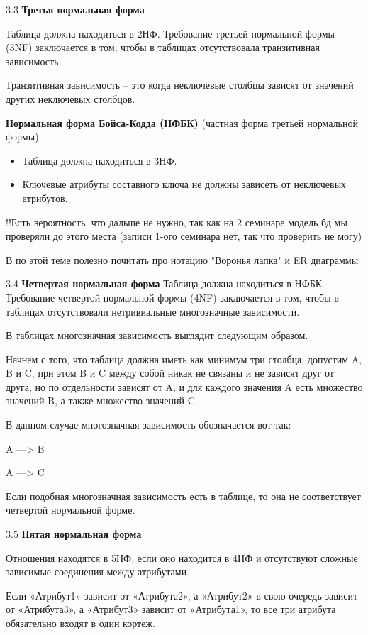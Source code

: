 3.3 \textbf{Третья нормальная форма}

Таблица должна находиться в 2НФ. Требование третьей нормальной формы (3NF) заключается в том, чтобы в таблицах отсутствовала транзитивная зависимость.

Транзитивная зависимость – это когда неключевые столбцы зависят от значений других неключевых столбцов.

\textbf{Нормальная форма Бойса-Кодда (НФБК)} (частная форма третьей нормальной формы)

\begin{itemize}
	\item Таблица должна находиться в 3НФ. 
	\item Ключевые атрибуты составного ключа не должны зависеть от неключевых атрибутов.
\end{itemize}

\color{olive} !!Есть вероятность, что дальше не нужно, так как на 2 семинаре модель бд мы проверяли до этого места (записи 1-ого семинара нет, так что проверить не могу)

В по этой теме полезно почитать про нотацию "Воронья лапка" и ER диаграммы
\color{black} 

3.4 \textbf{Четвертая нормальная форма}
Таблица должна находиться в НФБК.
Требование четвертой нормальной формы (4NF) заключается в том, чтобы в таблицах отсутствовали нетривиальные многозначные зависимости.

В таблицах многозначная зависимость выглядит следующим образом.

Начнем с того, что таблица должна иметь как минимум три столбца, допустим A, B и C, при этом B и C между собой никак не связаны и не зависят друг от друга, но по отдельности зависят от A, и для каждого значения A есть множество значений B, а также множество значений C.

В данном случае многозначная зависимость обозначается вот так:

A —> B

A —> C

Если подобная многозначная зависимость есть в таблице, то она не соответствует четвертой нормальной форме.

3.5 \textbf{Пятая нормальная форма}

Отношения находятся в 5НФ, если оно находится в 4НФ и отсутствуют сложные зависимые соединения между атрибутами.

Если «Атрибут1» зависит от «Атрибута2», а «Атрибут2» в свою очередь зависит от «Атрибута3», а «Атрибут3» зависит от «Атрибута1», то все три атрибута обязательно входят в один кортеж.

